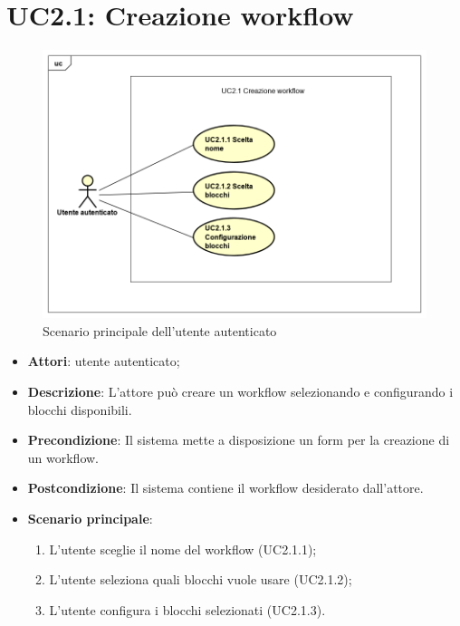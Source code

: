 \section{UC2.1: Creazione workflow}
\label{UC2.1}
\begin{figure} [h]
	\centering
	\includegraphics[scale=0.4]{./Diagram/UC2-1.png}
	\caption{Scenario principale dell'utente autenticato }\label{}
\end{figure}
\begin{itemize}
	\item \textbf{Attori}: utente autenticato;
	\item \textbf{Descrizione}: L'attore può creare un workflow selezionando e configurando i blocchi disponibili.
	\item \textbf{Precondizione}: Il sistema mette a disposizione un form per la creazione di un workflow.
	\item \textbf{Postcondizione}: Il sistema contiene il workflow desiderato dall'attore.
	\item \textbf{Scenario principale}:
	\begin{enumerate} \item L'utente sceglie il nome del workflow (UC2.1.1);  \item  L'utente seleziona quali blocchi vuole usare (UC2.1.2);  \item 
		L'utente configura i blocchi selezionati (UC2.1.3).\end{enumerate}
\end{itemize}


